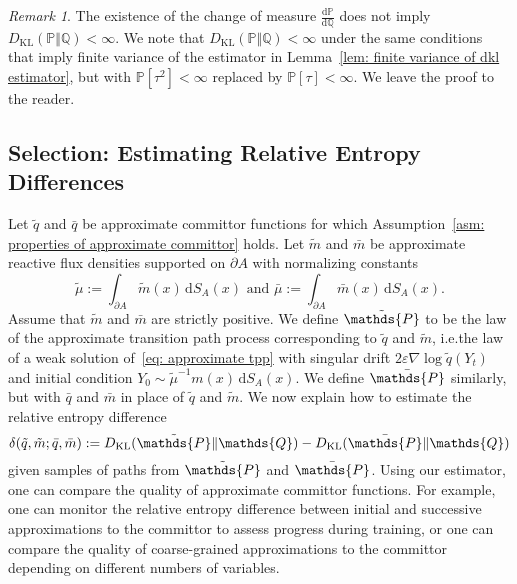 \documentclass[reqno]{amsart}
\newcommand{\eps}{\varepsilon}
\newcommand{\1}{\mathds{1}}
\renewcommand{\d}{\mathrm{d}}
\newcommand{\grad}{\nabla}
\renewcommand{\P}{\mathds{P}}
\newcommand{\Q}{\mathds{Q}}
\newcommand{\dkl}{D_{\mathrm{KL}}}
\theoremstyle{definition}
\theoremstyle{remark}
\newtheorem{remark}{Remark}
\begin{document}
\begin{remark}
The existence of the change of measure $\frac{\d \P}{\d \Q}$ does not imply $\dkl( \P \Vert \Q) < \infty$. We note that $\dkl(\P \Vert \Q) < \infty$ under the same conditions that imply finite variance of the estimator in Lemma~\ref{lem: finite variance of dkl estimator}, but with $\P[\tau^2] < \infty$ replaced by $\P[\tau] < \infty$. We leave the proof to the reader. 
\end{remark}


\subsection{Selection: Estimating Relative Entropy Differences}
\label{sec: selection}

Let $\tilde q$ and $\bar q$ be approximate committor functions for which Assumption~\ref{asm: properties of approximate committor} holds. Let $\tilde m$ and $\bar m$ be approximate reactive flux densities supported on $\partial A$ with normalizing constants
\begin{equation*}
  \tilde \mu := \int_{\partial A} \tilde m(x) \, \d S_A(x)  \text{ and } \bar \mu := \int_{\partial A} \bar m(x) \, \d S_A(x).
\end{equation*}
Assume that $\tilde m$ and $\bar m$ are strictly positive. 
We define $\tilde \P$ to be the law of the approximate transition path process corresponding to $\tilde q$ and $\tilde m$, i.e.\@ the law of a weak solution of~\eqref{eq: approximate tpp} with singular drift $2\eps \grad \log \tilde q(Y_t)$  and initial condition $Y_0 \sim \tilde \mu^{-1} m(x) \, \d S_A(x)$. We define $\bar \P$ similarly, but with $\bar q$ and $\bar m$ in place of $\tilde q$ and $\tilde m$. 
We now explain how to estimate the relative entropy difference
\begin{equation*}
  \delta(\tilde q, \tilde m ; \bar q, \bar m) := \dkl(\tilde \P \Vert \Q) - \dkl(\bar \P \Vert \Q)
\end{equation*}
given samples of paths from $\tilde \P$ and $\bar \P$. Using our estimator, one can compare the quality of approximate committor functions.
For example, one can monitor the relative entropy difference between initial and successive approximations to the committor to assess progress during training, or one can compare the quality of coarse-grained approximations to the committor depending on different numbers of variables. 
\end{document}
